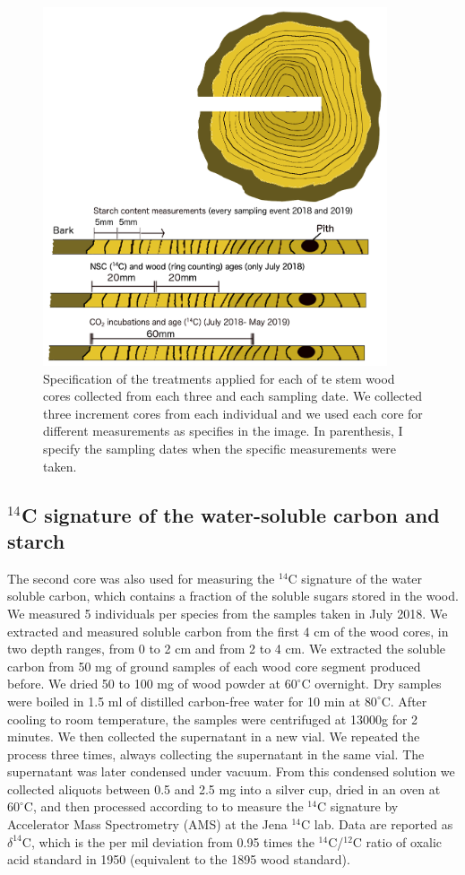 \documentclass{article}
\begin{document}
 \begin{figure}[h] %
   \centering
   \includegraphics[width=4in]{figure_methods.png} 
   \caption{Specification of the treatments applied for each of te stem wood cores collected from each three and each sampling date. We collected three increment cores from each individual and we used each core for different measurements as specifies in the image. In parenthesis, I specify the sampling dates when the specific measurements were taken.}
   \label{fig:Sampling_scheme}
\end{figure}



\subsection{$^{14}$C signature of the water-soluble carbon and starch} 

The second core was also used for measuring the $^{14}$C signature of the water soluble carbon, which contains a fraction of the soluble sugars stored in the wood. We measured 5 individuals per species from the samples taken in July 2018. We extracted and measured soluble carbon from the first 4 cm of the wood cores, in two depth ranges, from 0 to 2 cm and from 2 to 4 cm. We extracted the soluble carbon from 50 mg of ground samples of each wood core segment produced before. We dried 50 to 100 mg of wood powder at $60^{\circ}$C overnight. Dry samples were boiled in 1.5 ml of distilled carbon-free water for 10 min at $80^{\circ}$C. After cooling to room temperature, the samples were centrifuged at 13000g for 2 minutes. We then collected the supernatant in a new vial. We repeated the process three times, always collecting the supernatant in the same vial. The supernatant was later condensed under vacuum. From this condensed solution we collected aliquots between 0.5 and 2.5 mg into a silver cup, dried in an oven at $60^{\circ}$C, and then processed according to \citet{steinhof:2017} to measure the $^{14}$C signature by Accelerator Mass Spectrometry (AMS) at the Jena $^{14}$C lab. Data are reported as $\delta^{14}$C, which is the per mil deviation from 0.95 times the $^{14}$C/$^{12}$C ratio of oxalic acid standard in 1950 (equivalent to the 1895 wood standard).
\end{document}

